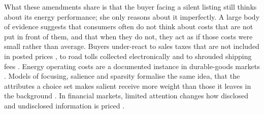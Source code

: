What these amendments share is that the buyer facing a silent listing still thinks about its energy performance; she only reasons about it imperfectly. A large body of evidence suggests that consumers often do not think about costs that are not put in front of them, and that when they do not, they act as if those costs were small rather than average. Buyers under-react to sales taxes that are not included in posted prices \citep{chetty_salience_2009}, to road tolls collected electronically \citep{finkelstein_eztax_2009} and to shrouded shipping fees \citep{brown_shrouded_2010}. Energy operating costs are a documented instance in durable-goods markets \citep[e.g.,][]{allcott_consumers_2011, sallee_rational_2014, allcott_evaluating_2015}. Models of focusing, salience and sparsity formalise the same idea, that the attributes a choice set makes salient receive more weight than those it leaves in the background \citep[e.g.,][]{koszegi_model_2013, bordalo_salience_2013, gabaix_sparsity_2014}. In financial markets, limited attention changes how disclosed and undisclosed information is priced \citep[e.g.,][]{hirshleifer_limited_2003, dellavigna_investor_2009}.
